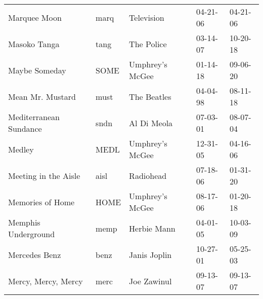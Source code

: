 \begin{longtable}{p{}p{}p{}p{}p{}}
                                                            Marquee Moon &          marq &                                               Television &              04-21-06 &             04-21-06 \\
                                                            Masoko Tanga &          tang &                                               The Police &              03-14-07 &             10-20-18 \\
                                                           Maybe Someday &          SOME &                                          Umphrey's McGee &              01-14-18 &             09-06-20 \\
                                                        Mean Mr. Mustard &          must &                                              The Beatles &              04-04-98 &             08-11-18 \\
                                                  Mediterranean Sundance &          sndn &                                              Al Di Meola &              07-03-01 &             08-07-04 \\
                                                                  Medley &          MEDL &                                          Umphrey's McGee &              12-31-05 &             04-16-06 \\
                                                    Meeting in the Aisle &          aisl &                                                Radiohead &              07-18-06 &             01-31-20 \\
                                                        Memories of Home &          HOME &                                          Umphrey's McGee &              08-17-06 &             01-20-18 \\
                                                     Memphis Underground &          memp &                                              Herbie Mann &              04-01-05 &             10-03-09 \\
                                                           Mercedes Benz &          benz &                                             Janis Joplin &              10-27-01 &             05-25-03 \\
                                                     Mercy, Mercy, Mercy &          merc &                                              Joe Zawinul &              09-13-07 &             09-13-07 \\

\end{longtable}
